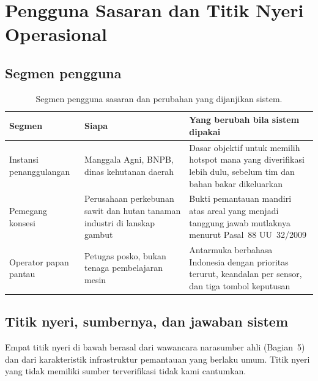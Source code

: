 %

\section{Pengguna Sasaran dan Titik Nyeri Operasional}
\label{app:pengguna}

\subsection*{Segmen pengguna}

\begin{table}[!htbp]
\centering
\small
\begin{tabular}{p{2.6cm}p{4.2cm}p{5.2cm}}
\hline
\textbf{Segmen} & \textbf{Siapa} & \textbf{Yang berubah bila sistem dipakai} \\
\hline
Instansi penanggulangan &
Manggala Agni, BNPB, dinas kehutanan daerah &
Dasar objektif untuk memilih hotspot mana yang diverifikasi lebih dulu, sebelum
tim dan bahan bakar dikeluarkan \\
Pemegang konsesi &
Perusahaan perkebunan sawit dan hutan tanaman industri di lanskap gambut &
Bukti pemantauan mandiri atas areal yang menjadi tanggung jawab mutlaknya
menurut Pasal~88 UU~32/2009 \\
Operator papan pantau &
Petugas posko, bukan tenaga pembelajaran mesin &
Antarmuka berbahasa Indonesia dengan prioritas terurut, keandalan per sensor,
dan tiga tombol keputusan \\
\hline
\end{tabular}
\caption{Segmen pengguna sasaran dan perubahan yang dijanjikan sistem.}
\end{table}

\subsection*{Titik nyeri, sumbernya, dan jawaban sistem}

Empat titik nyeri di bawah berasal dari wawancara narasumber ahli
(Bagian~5) dan dari karakteristik infrastruktur pemantauan yang berlaku umum.
Titik nyeri yang tidak memiliki sumber terverifikasi tidak kami cantumkan.

